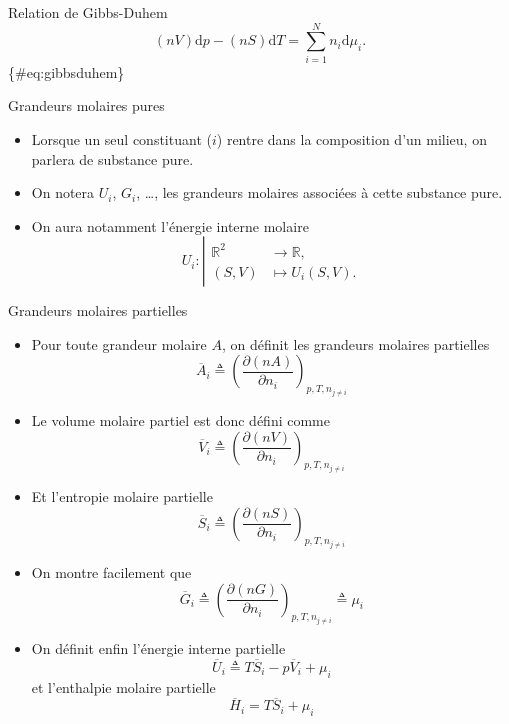 \documentclass[
  ignorenonframetext,
]{beamer}
\providecommand{\tightlist}{%
  \setlength{\itemsep}{0pt}\setlength{\parskip}{0pt}}
\begin{document}
\begin{frame}{Relation de Gibbs-Duhem}
\protect\hypertarget{relation-de-gibbs-duhem}{}
\[
\left ( n V \right ) \mathrm{d} p - \left ( n S \right ) \mathrm{d} T = \sum _ {i = 1} ^ N n _ i \mathrm{d} \mu _ i.
\] \{\#eq:gibbsduhem\}
\end{frame}

\begin{frame}{Grandeurs molaires pures}
\protect\hypertarget{grandeurs-molaires-pures}{}
\begin{itemize}
\tightlist
\item
  Lorsque un seul constituant (\(i\)) rentre dans la composition d'un
  milieu, on parlera de substance pure.
\item
  On notera \(U _ i\), \(G _ i\), \ldots, les grandeurs molaires
  associées à cette substance pure.
\item
  On aura notamment l'énergie interne molaire \[
  U _ i \colon \left \vert
  \begin{aligned}
  \mathbb{R} ^ 2 & \to \mathbb{R}, \\
  \left ( S, V \right ) & \mapsto U _ i \left ( S, V \right ).
  \end{aligned} \right .
  \]
\end{itemize}
\end{frame}

\begin{frame}{Grandeurs molaires partielles}
\protect\hypertarget{grandeurs-molaires-partielles}{}
\begin{itemize}
\tightlist
\item
  Pour toute grandeur molaire \(A\), on définit les grandeurs molaires
  partielles \[
  \overline{A} _ i \triangleq \left ( \frac{\partial \left ( n A \right )}{\partial n _ i} \right ) _ {p, T, n _ {j \ne i}}
  \]
\item
  Le volume molaire partiel est donc défini comme \[
  \overline{V} _ i \triangleq \left ( \frac{\partial \left ( n V \right )}{\partial n _ i} \right ) _ {p, T, n _ {j \ne i}}
  \]
\item
  Et l'entropie molaire partielle \[
  \overline{S} _ i \triangleq \left ( \frac{\partial \left ( n S \right )}{\partial n _ i} \right ) _ {p, T, n _ {j \ne i}}
  \]
\item
  On montre facilement que \[
  \overline{G} _ i \triangleq \left ( \frac{\partial \left ( n G \right )}{\partial n _ i} \right ) _ {p, T, n _ {j \ne i}} \triangleq \mu _ i
  \]
\item
  On définit enfin l'énergie interne partielle \[
  \overline{U} _ i \triangleq T \overline{S} _ i - p \overline{V} _ i + \mu _ i
  \] et l'enthalpie molaire partielle \[
  \overline{H} _ i = T \overline{S} _ i + \mu _ i
  \]
\end{itemize}
\end{frame}
\end{document}
